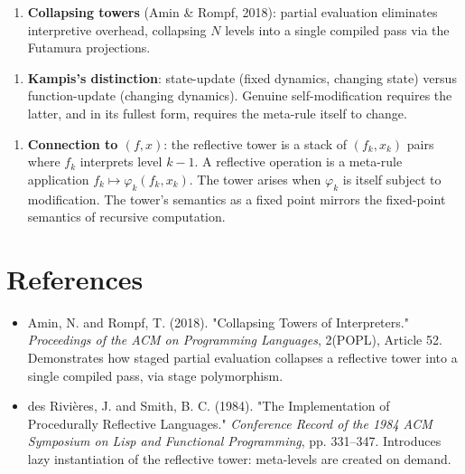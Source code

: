 \begin{enumerate}
\item \textbf{Collapsing towers} (Amin \& Rompf, 2018): partial evaluation eliminates interpretive overhead, collapsing $N$ levels into a single compiled pass via the Futamura projections.
\end{enumerate}

\begin{enumerate}
\item \textbf{Kampis's distinction}: state-update (fixed dynamics, changing state) versus function-update (changing dynamics). Genuine self-modification requires the latter, and in its fullest form, requires the meta-rule itself to change.
\end{enumerate}

\begin{enumerate}
\item \textbf{Connection to $(f, x)$}: the reflective tower is a stack of $(f_k, x_k)$ pairs where $f_k$ interprets level $k-1$. A reflective operation is a meta-rule application $f_k \mapsto \varphi_k(f_k, x_k)$. The tower arises when $\varphi_k$ is itself subject to modification. The tower's semantics as a fixed point mirrors the fixed-point semantics of recursive computation.
\end{enumerate}



\section{References}

\begin{itemize}
\item Amin, N. and Rompf, T. (2018). "Collapsing Towers of Interpreters." \textit{Proceedings of the ACM on Programming Languages}, 2(POPL), Article 52. Demonstrates how staged partial evaluation collapses a reflective tower into a single compiled pass, via stage polymorphism.
\end{itemize}

\begin{itemize}
\item des Rivières, J. and Smith, B. C. (1984). "The Implementation of Procedurally Reflective Languages." \textit{Conference Record of the 1984 ACM Symposium on Lisp and Functional Programming}, pp. 331--347. Introduces lazy instantiation of the reflective tower: meta-levels are created on demand.
\end{itemize}

